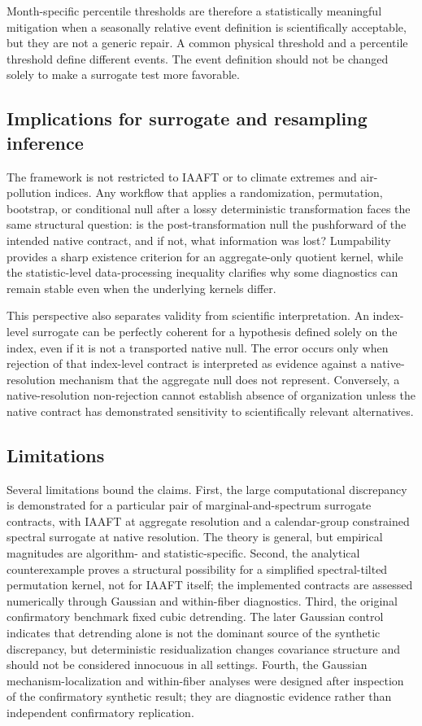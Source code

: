 Month-specific percentile thresholds are therefore a statistically meaningful mitigation when a seasonally relative event definition is scientifically acceptable, but they are not a generic repair. A common physical threshold and a percentile threshold define different events. The event definition should not be changed solely to make a surrogate test more favorable.

\subsection{Implications for surrogate and resampling inference}\label{sec:broader}

The framework is not restricted to IAAFT or to climate extremes and air-pollution indices. Any workflow that applies a randomization, permutation, bootstrap, or conditional null after a lossy deterministic transformation faces the same structural question: is the post-transformation null the pushforward of the intended native contract, and if not, what information was lost? Lumpability provides a sharp existence criterion for an aggregate-only quotient kernel, while the statistic-level data-processing inequality clarifies why some diagnostics can remain stable even when the underlying kernels differ.

This perspective also separates validity from scientific interpretation. An index-level surrogate can be perfectly coherent for a hypothesis defined solely on the index, even if it is not a transported native null. The error occurs only when rejection of that index-level contract is interpreted as evidence against a native-resolution mechanism that the aggregate null does not represent. Conversely, a native-resolution non-rejection cannot establish absence of organization unless the native contract has demonstrated sensitivity to scientifically relevant alternatives.

\subsection{Limitations}\label{sec:limitations}

Several limitations bound the claims. First, the large computational discrepancy is demonstrated for a particular pair of marginal-and-spectrum surrogate contracts, with IAAFT at aggregate resolution and a calendar-group constrained spectral surrogate at native resolution. The theory is general, but empirical magnitudes are algorithm- and statistic-specific. Second, the analytical counterexample proves a structural possibility for a simplified spectral-tilted permutation kernel, not for IAAFT itself; the implemented contracts are assessed numerically through Gaussian and within-fiber diagnostics. Third, the original confirmatory benchmark fixed cubic detrending. The later Gaussian control indicates that detrending alone is not the dominant source of the synthetic discrepancy, but deterministic residualization changes covariance structure and should not be considered innocuous in all settings. Fourth, the Gaussian mechanism-localization and within-fiber analyses were designed after inspection of the confirmatory synthetic result; they are diagnostic evidence rather than independent confirmatory replication.

